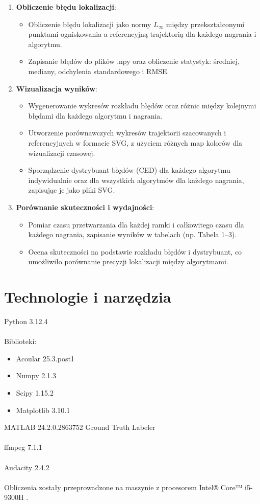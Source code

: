 \documentclass[12pt]{article}
\begin{document}
\begin{enumerate}
\item \textbf{Obliczenie błędu lokalizacji}:
\begin{itemize}
    \item Obliczenie błędu lokalizacji jako normy \( L_{\infty} \) między przekształconymi punktami ogniskowania a referencyjną trajektorią dla każdego nagrania i algorytmu.
    \item Zapisanie błędów do plików .npy oraz obliczenie statystyk: średniej, mediany, odchylenia standardowego i RMSE.
\end{itemize}

\item \textbf{Wizualizacja wyników}:
\begin{itemize}
    \item Wygenerowanie wykresów rozkładu błędów oraz różnic między kolejnymi błędami dla każdego algorytmu i nagrania.
    \item Utworzenie porównawczych wykresów trajektorii szacowanych i referencyjnych w formacie SVG, z użyciem różnych map kolorów dla wizualizacji czasowej.
    \item Sporządzenie dystrybuant błędów (CED) dla każdego algorytmu indywidualnie oraz dla wszystkich algorytmów dla każdego nagrania, zapisując je jako pliki SVG.
\end{itemize}

\item \textbf{Porównanie skuteczności i wydajności}:
\begin{itemize}
    \item Pomiar czasu przetwarzania dla każdej ramki i całkowitego czasu dla każdego nagrania, zapisanie wyników w tabelach (np. Tabela 1--3).
    \item Ocena skuteczności na podstawie rozkładu błędów i dystrybuant, co umożliwiło porównanie precyzji lokalizacji między algorytmami.
\end{itemize}
\end{enumerate}

\section{Technologie i narzędzia}
Python 3.12.4\\\\
Biblioteki:
    \begin{itemize}
    \item{Acoular 25.3.post1 \cite{acoular}}
    \item{Numpy 2.1.3 \cite{numpy}}
    \item{Scipy 1.15.2 \cite{scipy}}
    \item{Matplotlib 3.10.1 \cite{matplotlib}}
    \end{itemize}
MATLAB 24.2.0.2863752 Ground Truth Labeler \cite{labeler}\\\\
ffmpeg 7.1.1 \cite{ffmpeg}\\\\
Audacity 2.4.2 \cite{audacity}\\\\
Obliczenia zostały przeprowadzone na maszynie z procesorem Intel® Core™ i5-9300H \cite{intel}.
\end{document}
